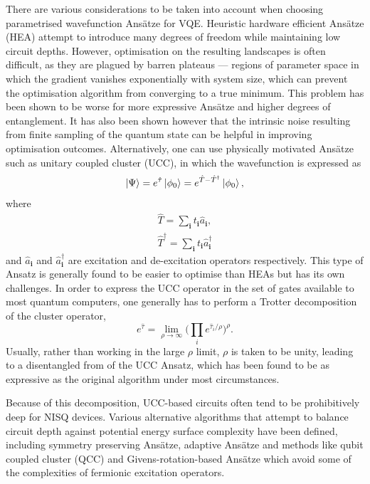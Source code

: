 \documentclass[%
 reprint,
 amsmath,amssymb,
 aps,
]{revtex4-2}
\begin{document}
There are various considerations to be taken into account when choosing parametrised wavefunction Ans\"atze for VQE. Heuristic hardware efficient Ans\"atze (HEA)\cite{Kandala2017} attempt to introduce many degrees of freedom while maintaining low circuit depths. However, optimisation on the resulting landscapes is often difficult, as they are plagued by barren plateaus\cite{McClean2018} --- regions of parameter space in which the gradient vanishes exponentially with system size, which can prevent the optimisation algorithm from converging to a true minimum. This problem has been shown to be worse for more expressive Ans\"atze \cite{Holmes2022} and higher degrees of entanglement.\cite{Marrero2021} It has also been shown however that the intrinsic noise resulting from finite sampling of the quantum state can be helpful in improving optimisation outcomes.\cite{Liu2023} Alternatively, one can use physically motivated Ans\"atze such as unitary coupled cluster (UCC),\cite{Kutzelnigg1982,Kutzelnigg1983,Kutzelnigg1984,Bartlett1989} in which the wavefunction is expressed as
\begin{equation}
\ket{\Psi} = e^{\hat \tau}\ket{\phi_0} = e^{\hat T - \hat T^\dagger}\ket{\phi_0},
\end{equation}
where
\begin{align}
\hat T = \sum_\mathbf{i} t_\mathbf{i} \hat a_\mathbf{i},\\
\hat T^\dagger = \sum_\mathbf{i} t_\mathbf{i} \hat a_\mathbf{i}^\dagger
\end{align}
and $\hat a_\mathbf{i}$ and $\hat a_\mathbf{i}^\dagger$ are excitation and de-excitation operators respectively. This type of Ansatz is generally found to be easier to optimise than HEAs but has its own challenges. In order to express the UCC operator in the set of gates available to most quantum computers, one generally has to perform a Trotter decomposition\cite{Trotter1959, Suzuki1976} of the cluster operator,
\begin{equation}
 e^{\hat \tau} = \lim_{\rho \rightarrow \infty}\Big(\prod_i e^{\hat\tau_i/\rho}\Big)^\rho.
\end{equation}
Usually, rather than working in the large $\rho$ limit, $\rho$ is taken to be unity, leading to a disentangled from of the UCC Ansatz, which has been found to be as expressive as the original algorithm under most circumstances.\cite{Evangelista2019}

Because of this decomposition, UCC-based circuits often tend to be prohibitively deep for NISQ devices. Various alternative algorithms that attempt to balance circuit depth against potential energy surface complexity have been defined, including symmetry preserving Ans\"atze,\cite{Gard2020} adaptive Ans\"atze\cite{Grimsley2019b} and methods like qubit coupled cluster (QCC)\cite{Ryabinkin2018,Ryabinkin2020} and Givens-rotation-based Ans\"atze\cite{Arrazola2022} which avoid some of the complexities of fermionic excitation operators.
\end{document}
